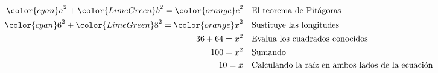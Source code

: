\begin{minipage}[t][][t]{0.6\textwidth}
\begin{solutionbox}{9.5cm}
\begin{align*}
            {\color{cyan}a}^2+{\color{LimeGreen}b}^2  ={\color{orange}c}^2 & \text{\quad El teorema de Pitágoras}                          \\
            {\color{cyan}6}^2+{\color{LimeGreen}8}^2  ={\color{orange}x}^2 & \text{\quad Sustituye las longitudes}                         \\
            36+64   =x^2                                                   & \text{\quad Evalua los cuadrados conocidos}                   \\
            100=x^2                                                        & \text{\quad Sumando }                                         \\
            10=x                                                           & \text{\quad Calculando la raíz en ambos lados de la ecuación} \\
        \end{align*}
    \end{solutionbox}
\end{minipage}
